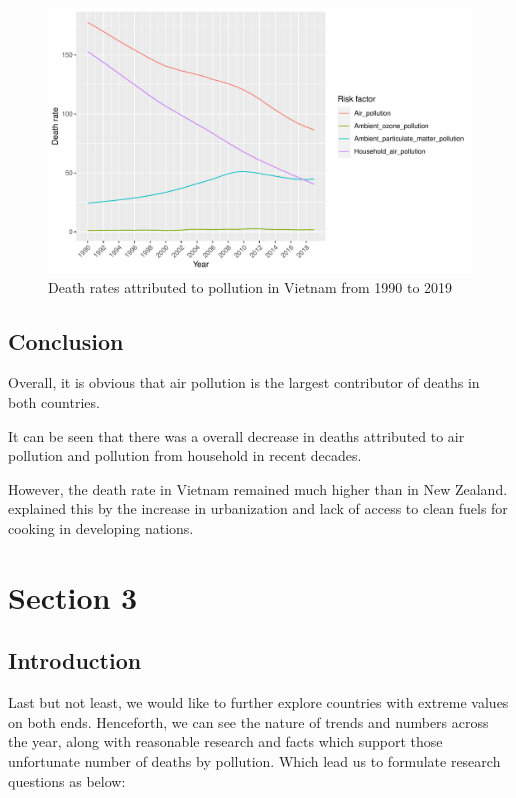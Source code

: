 \documentclass[11pt,a4paper,]{article}
\begin{document}
\begin{figure}[H]

{\centering \includegraphics[width=0.7\linewidth]{Assignment4_files/figure-latex/vnfig-1} 

}

\caption{Death rates attributed to pollution in Vietnam from 1990 to 2019}\label{fig:vnfig}
\end{figure}

\hypertarget{conclusion-1}{%
\subsection{Conclusion}\label{conclusion-1}}

Overall, it is obvious that air pollution is the largest contributor of deaths in both countries.

It can be seen that there was a overall decrease in deaths attributed to air pollution and pollution from household in recent decades.

However, the death rate in Vietnam remained much higher than in New Zealand. \textcite{gordon2014respiratory} explained this by the increase in urbanization and lack of access to clean fuels for cooking in developing nations.

\hypertarget{section-3}{%
\section{Section 3}\label{section-3}}

\hypertarget{introduction-2}{%
\subsection{Introduction}\label{introduction-2}}

Last but not least, we would like to further explore countries with extreme values on both ends. Henceforth, we can see the nature of trends and numbers across the year, along with reasonable research and facts which support those unfortunate number of deaths by pollution. Which lead us to formulate research questions as below:
\end{document}
